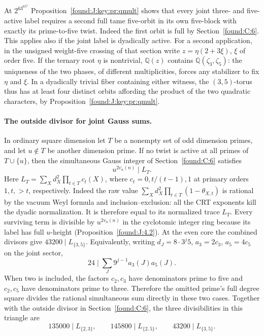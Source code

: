 \documentclass[11pt,a4paper]{article}
\numberwithin{equation}{section}
\theoremstyle{remark}
\newcommand{\QQ}{\mathbb Q}
\begin{document}
At $2^63^65^4$ Proposition~\ref{found:J:key:pr:qmult} shows that every joint three- and five-active label
requires a second full tame five-orbit in its own five-block with
exactly its prime-to-five twist. Indeed the first orbit is full by
Section~\ref{found:C:6}. This applies also if the joint label is dyadically
active. For a second application, in the unsigned weight-five crossing
of that section write $z=\eta(2+3\xi)$, $\xi$ of order five.
If the ternary root $\eta$ is nontrivial, $\QQ(z)$ contains
$\QQ(\zeta_3,\zeta_5)$: the uniqueness of the two phases, of different
multiplicities, forces any stabilizer to fix $\eta$ and $\xi$.
In a dyadically trivial fiber containing either witness, the
$(3,5)$-torus thus has at least four distinct orbits affording the
product of the two quadratic characters, by Proposition~\ref{found:J:key:pr:qmult}.

\paragraph{The outside divisor for joint Gauss sums.}
In ordinary square dimension let $T$ be a nonempty set of odd
dimension primes, and let $u\notin T$ be another dimension prime.
If no twist is active at all primes of $T\cup\{u\}$, then the
simultaneous Gauss integer of Section~\ref{found:C:6} satisfies
\[
                    u^{2v_u(n)}\mid L_T .
\]
Here $L_T=\sum_X d_X^2\prod_{t\in T}c_t(X)$, where
$c_t=0,t/(t-1),1$ at primary orders $1,t,>t$, respectively.
Indeed the raw value $\sum_Xd_X^2\prod_{t\in T}(1-\theta_{X,t})$
is rational by the vacuum Weyl formula and inclusion--exclusion:
all the CRT exponents kill the dyadic normalization. It is therefore
equal to its normalized trace $L_T$. Every surviving term is divisible
by $u^{2v_u(n)}$ in the cyclotomic integer ring because its label has full $u$-height (Proposition~\ref{found:J:4.2}). At the even core the
combined divisors give $43200\mid L_{\{3,5\}}$. Equivalently, writing
$d_J=8\cdot3^{j}5$, $a_3=2c_3$, $a_5=4c_5$ on the joint sector,
\[
                24\mid \sum_J 9^{j-1}a_3(J)a_5(J).
\]
When two is included, the factors $c_2,c_3$ have denominators prime
to five and $c_2,c_5$ have denominators prime to three. Therefore
the omitted prime's full degree square divides the rational
simultaneous sum directly in these two cases. Together with the
outside divisor in Section~\ref{found:C:6}, the three divisibilities in
this triangle are
\[
  135000\mid L_{\{2,3\}},\qquad 145800\mid L_{\{2,5\}},\qquad
  43200\mid L_{\{3,5\}} .
\]
\end{document}
